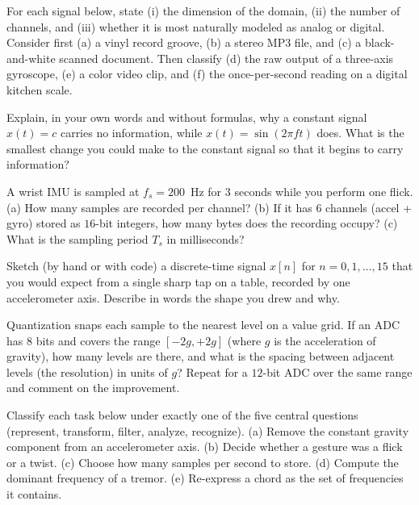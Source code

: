 \begin{exercise}
For each signal below, state (i) the dimension of the domain, (ii) the number of channels,
and (iii) whether it is most naturally modeled as analog or digital. Consider first (a) a vinyl record groove, (b) a
stereo MP3 file, and (c) a black-and-white scanned document. Then classify (d) the raw output of a three-axis gyroscope, (e) a
color video clip, and (f) the once-per-second reading on a digital kitchen scale.
\end{exercise}

\begin{exercise}
Explain, in your own words and without formulas, why a constant signal $x(t)=c$ carries no
information, while $x(t)=\sin(2\pi f t)$ does. What is the smallest change you could make to the
constant signal so that it begins to carry information?
\end{exercise}

\begin{exercise}
A wrist IMU is sampled at $f_s = 200$~Hz for $3$ seconds while you perform one flick. (a) How
many samples are recorded per channel? (b) If it has $6$ channels (accel + gyro) stored as
$16$-bit integers, how many bytes does the recording occupy? (c) What is the sampling period
$T_s$ in milliseconds?
\end{exercise}

\begin{exercise}
Sketch (by hand or with code) a discrete-time signal $x[n]$ for $n=0,1,\dots,15$ that you would
expect from a single sharp tap on a table, recorded by one accelerometer axis. Describe in words
the shape you drew and why.
\end{exercise}

\begin{exercise}
Quantization snaps each sample to the nearest level on a value grid. If an ADC has $8$ bits and
covers the range $[-2g, +2g]$ (where $g$ is the acceleration of gravity), how many levels are
there, and what is the spacing between adjacent levels (the resolution) in units of $g$? Repeat
for a $12$-bit ADC over the same range and comment on the improvement.
\end{exercise}

\begin{exercise}
Classify each task below under exactly one of the five central questions (represent, transform,
filter, analyze, recognize). (a) Remove the constant gravity component from an accelerometer
axis. (b) Decide whether a gesture was a flick or a twist. (c) Choose how many samples per
second to store. (d) Compute the dominant frequency of a tremor. (e) Re-express a chord as
the set of frequencies it contains.
\end{exercise}

